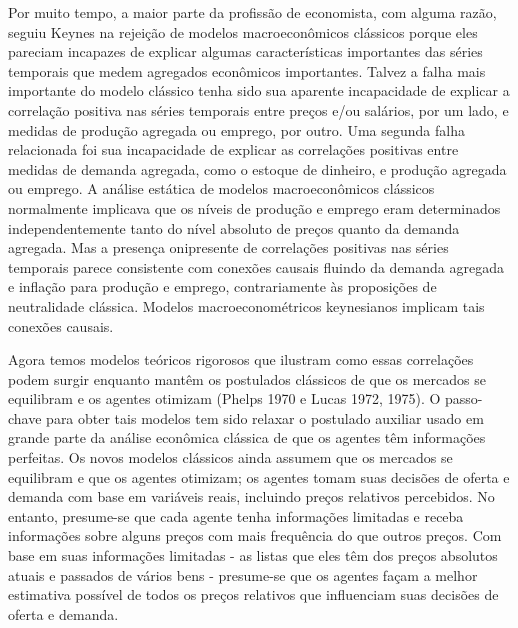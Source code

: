 \documentclass[a4paper,12pt]{article}[abntex2]
\begin{document}
Por muito tempo, a maior parte da profissão de economista, com alguma razão, seguiu Keynes na rejeição de modelos macroeconômicos clássicos porque eles pareciam incapazes de explicar algumas características importantes das séries temporais que medem agregados econômicos importantes. Talvez a falha mais importante do modelo clássico tenha sido sua aparente incapacidade de explicar a correlação positiva nas séries temporais entre preços e/ou salários, por um lado, e medidas de produção agregada ou emprego, por outro. Uma segunda falha relacionada foi sua incapacidade de explicar as correlações positivas entre medidas de demanda agregada, como o estoque de dinheiro, e produção agregada ou emprego. A análise estática de modelos macroeconômicos clássicos normalmente implicava que os níveis de produção e emprego eram determinados independentemente tanto do nível absoluto de preços quanto da demanda agregada. Mas a presença onipresente de correlações positivas nas séries temporais parece consistente com conexões causais fluindo da demanda agregada e inflação para produção e emprego, contrariamente às proposições de neutralidade clássica. Modelos macroeconométricos keynesianos implicam tais conexões causais.

Agora temos modelos teóricos rigorosos que ilustram como essas correlações podem surgir enquanto mantêm os postulados clássicos de que os mercados se equilibram e os agentes otimizam (Phelps 1970 e Lucas 1972, 1975). O passo-chave para obter tais modelos tem sido relaxar o postulado auxiliar usado em grande parte da análise econômica clássica de que os agentes têm informações perfeitas. Os novos modelos clássicos ainda assumem que os mercados se equilibram e que os agentes otimizam; os agentes tomam suas decisões de oferta e demanda com base em variáveis reais, incluindo preços relativos percebidos. No entanto, presume-se que cada agente tenha informações limitadas e receba informações sobre alguns preços com mais frequência do que outros preços. Com base em suas informações limitadas - as listas que eles têm dos preços absolutos atuais e passados de vários bens - presume-se que os agentes façam a melhor estimativa possível de todos os preços relativos que influenciam suas decisões de oferta e demanda.
\end{document}
